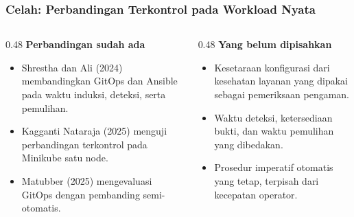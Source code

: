 {
\usebackgroundtemplate{\backgroundcontent}
\begin{frame}
    \frametitle{Celah: Perbandingan Terkontrol pada Workload Nyata}
    \begin{columns}[T]
        \begin{column}{0.48\textwidth}
            \scriptsize
            \textbf{Perbandingan sudah ada}
            \begin{itemize}\setlength{\itemsep}{3pt}
                \item Shrestha dan Ali (2024) membandingkan GitOps dan Ansible pada waktu induksi, deteksi, serta pemulihan.
                \item Kagganti Nataraja (2025) menguji perbandingan terkontrol pada Minikube satu node.
                \item Matubber (2025) mengevaluasi GitOps dengan pembanding semi-otomatis.
            \end{itemize}
        \end{column}
        \begin{column}{0.48\textwidth}
            \scriptsize
            \textbf{Yang belum dipisahkan}
            \begin{itemize}\setlength{\itemsep}{3pt}
                \item Kesetaraan konfigurasi dari kesehatan layanan yang dipakai sebagai pemeriksaan pengaman.
                \item Waktu deteksi, ketersediaan bukti, dan waktu pemulihan yang dibedakan.
                \item Prosedur imperatif otomatis yang tetap, terpisah dari kecepatan operator.
            \end{itemize}
        \end{column}
    \end{columns}
    \vspace{0.10cm}
    \vspace{0.06cm}
\end{frame}
}


